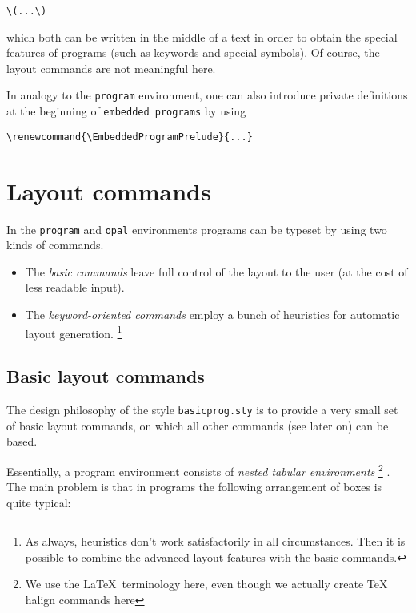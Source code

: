 \quad\verb+\(...\)+

which both can be written in the middle of a text in order to obtain the
special features of programs (such as keywords and special symbols).  Of
course, the layout commands are not meaningful here.

In analogy to the \texttt{program} environment, one can also introduce
private definitions at the beginning of \texttt{embedded programs} by using

\quad\verb+\renewcommand{\EmbeddedProgramPrelude}{...}+






\section{Layout commands}

In the \texttt{program} and \texttt{opal} environments programs can be
typeset by using two kinds of commands.

\begin{itemize}
  \item The \emph{basic commands} leave full control of the layout to the
    user (at the cost of less readable input).
  \item The \emph{keyword-oriented commands} employ a bunch of heuristics
    for automatic layout generation.%
    \footnote{As always, heuristics don't work satisfactorily in all
      circumstances. Then it is possible to combine the advanced layout
      features with the basic commands.}
\end{itemize}




\subsection{Basic layout commands}

The design philosophy of the style \texttt{basicprog.sty} is to provide a
very small set of basic layout commands, on which all other commands (see
later on) can be based.

Essentially, a program environment consists of \emph{nested tabular
environments}%
\footnote{We use the \LaTeX~terminology here, even though we actually
  create \TeX~ halign commands here}%
. The main problem is that in programs the following arrangement of boxes
is quite typical:

